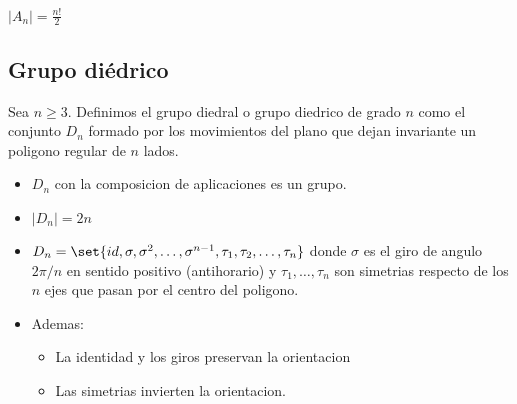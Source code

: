 \begin{proposition}
	\(|A_n| = \frac{n! }{2 }\)
\end{proposition}

\subsection{Grupo diédrico}
\begin{definition}
	Sea \(n \geq 3\). Definimos el grupo diedral o grupo diedrico de grado \(n \) como el conjunto \(D_n \) formado por los movimientos del plano que dejan invariante un poligono regular de \(n \) lados.
\end{definition}

\begin{proposition}
	\begin{itemize}
		\item \(D_n \) con la composicion de aplicaciones es un grupo.
		\item \(|D_n| = 2n \)
		\item \(D_n = \set{id, \sigma, \sigma^{2}, \ldots, \sigma^{n-1}, \tau_1, \tau_2,\ldots,\tau_n }\) donde \(\sigma\) es el giro de angulo \(2\pi / n \) en sentido positivo (antihorario) y \(\tau_1, \ldots, \tau_n \) son simetrias respecto de los \(n \) ejes que pasan por el centro del poligono.
		\item Ademas: \begin{itemize}
			      \item La identidad y los giros preservan la orientacion
			      \item Las simetrias invierten la orientacion.
		      \end{itemize}
	\end{itemize}
\end{proposition}

